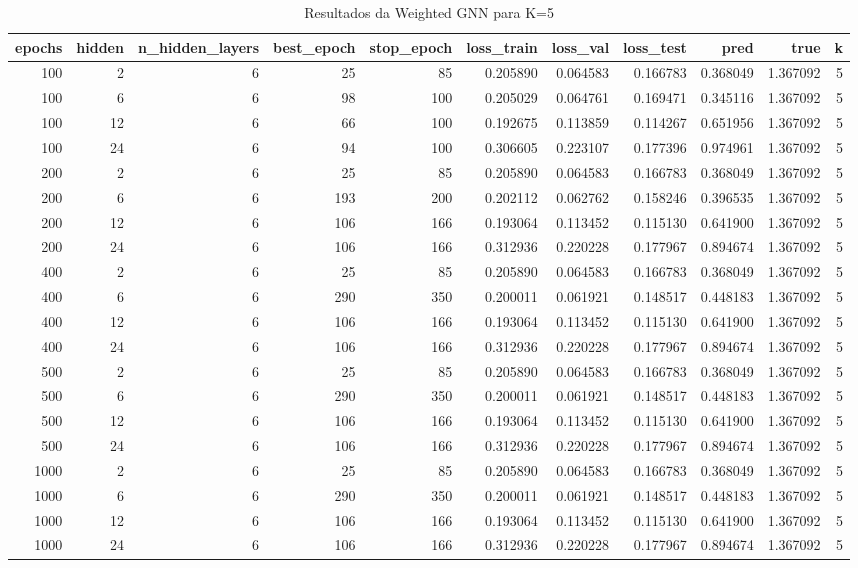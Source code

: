 \begin{table}
\caption{Resultados da Weighted GNN para K=5}
\label{tab:weighted_gnn_results_k5}
\begin{tabular}{rrrrrrrrrrr}
\toprule
epochs & hidden & n\_hidden\_layers & best\_epoch & stop\_epoch & loss\_train & loss\_val & loss\_test & pred & true & k \\
\midrule
100 & 2 & 6 & 25 & 85 & 0.205890 & 0.064583 & 0.166783 & 0.368049 & 1.367092 & 5 \\
100 & 6 & 6 & 98 & 100 & 0.205029 & 0.064761 & 0.169471 & 0.345116 & 1.367092 & 5 \\
100 & 12 & 6 & 66 & 100 & 0.192675 & 0.113859 & 0.114267 & 0.651956 & 1.367092 & 5 \\
100 & 24 & 6 & 94 & 100 & 0.306605 & 0.223107 & 0.177396 & 0.974961 & 1.367092 & 5 \\
200 & 2 & 6 & 25 & 85 & 0.205890 & 0.064583 & 0.166783 & 0.368049 & 1.367092 & 5 \\
200 & 6 & 6 & 193 & 200 & 0.202112 & 0.062762 & 0.158246 & 0.396535 & 1.367092 & 5 \\
200 & 12 & 6 & 106 & 166 & 0.193064 & 0.113452 & 0.115130 & 0.641900 & 1.367092 & 5 \\
200 & 24 & 6 & 106 & 166 & 0.312936 & 0.220228 & 0.177967 & 0.894674 & 1.367092 & 5 \\
400 & 2 & 6 & 25 & 85 & 0.205890 & 0.064583 & 0.166783 & 0.368049 & 1.367092 & 5 \\
400 & 6 & 6 & 290 & 350 & 0.200011 & 0.061921 & 0.148517 & 0.448183 & 1.367092 & 5 \\
400 & 12 & 6 & 106 & 166 & 0.193064 & 0.113452 & 0.115130 & 0.641900 & 1.367092 & 5 \\
400 & 24 & 6 & 106 & 166 & 0.312936 & 0.220228 & 0.177967 & 0.894674 & 1.367092 & 5 \\
500 & 2 & 6 & 25 & 85 & 0.205890 & 0.064583 & 0.166783 & 0.368049 & 1.367092 & 5 \\
500 & 6 & 6 & 290 & 350 & 0.200011 & 0.061921 & 0.148517 & 0.448183 & 1.367092 & 5 \\
500 & 12 & 6 & 106 & 166 & 0.193064 & 0.113452 & 0.115130 & 0.641900 & 1.367092 & 5 \\
500 & 24 & 6 & 106 & 166 & 0.312936 & 0.220228 & 0.177967 & 0.894674 & 1.367092 & 5 \\
1000 & 2 & 6 & 25 & 85 & 0.205890 & 0.064583 & 0.166783 & 0.368049 & 1.367092 & 5 \\
1000 & 6 & 6 & 290 & 350 & 0.200011 & 0.061921 & 0.148517 & 0.448183 & 1.367092 & 5 \\
1000 & 12 & 6 & 106 & 166 & 0.193064 & 0.113452 & 0.115130 & 0.641900 & 1.367092 & 5 \\
1000 & 24 & 6 & 106 & 166 & 0.312936 & 0.220228 & 0.177967 & 0.894674 & 1.367092 & 5 \\
\bottomrule
\end{tabular}
\end{table}
